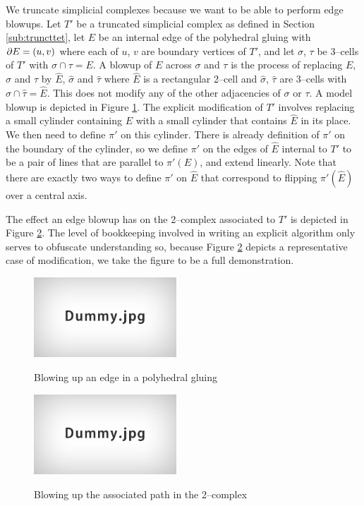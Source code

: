 We truncate simplicial complexes because we want to be able to perform edge blowups.
Let $T'$ be a truncated simplicial complex as defined in Section \ref{sub:truncttet}, let $E$ be an internal edge of the polyhedral gluing with $\partial E=(u,v)$ where each of $u$, $v$ are boundary vertices of $T'$, and let $\sigma$, $\tau$ be 3--cells of $T'$ with $\sigma\cap\tau=E$.
A blowup of $E$ across $\sigma$ and $\tau$ is the process of replacing $E$, $\sigma$ and $\tau$ by $\hat{E}$, $\hat{\sigma}$ and $\hat{\tau}$ where $\hat{E}$ is a rectangular 2--cell and $\hat{\sigma}$, $\hat{\tau}$ are 3--cells with $\hat{\sigma}\cap\hat{\tau}=\hat{E}$.
This does not modify any of the other adjacencies of $\sigma$ or $\tau$.
A model blowup is depicted in Figure \ref{fig:edgeblowup}.
The explicit modification of $T'$ involves replacing a small cylinder containing $E$ with a small cylinder that contains $\hat{E}$ in its place.
We then need to define $\pi'$ on this cylinder.
There is already definition of $\pi'$ on the boundary of the cylinder, so we define $\pi'$ on the edges of $\hat{E}$ internal to $T'$ to be a pair of lines that are parallel to $\pi'(E)$, and extend linearly.
Note that there are exactly two ways to define $\pi'$ on $\hat{E}$ that correspond to flipping $\pi'(\hat{E})$ over a central axis.

The effect an edge blowup has on the 2--complex associated to $T'$ is depicted in Figure \ref{fig:edgeblowup2complex}.
The level of bookkeeping involved in writing an explicit algorithm only serves to obfuscate understanding so, because Figure \ref{fig:edgeblowup2complex} depicts a representative case of modification, we take the figure to be a full demonstration.

\begin{figure}
	\centering
	\captionsetup{justification=centering}
	\caption{Blowing up an edge in a polyhedral gluing}
	\includegraphics[height=3cm]{figures/dummy.jpg}
	\label{fig:edgeblowup}
\end{figure}

\begin{figure}
	\centering
	\captionsetup{justification=centering}
	\caption{Blowing up the associated path in the 2--complex}
	\includegraphics[height=3cm]{figures/dummy.jpg}
	\label{fig:edgeblowup2complex}
\end{figure}